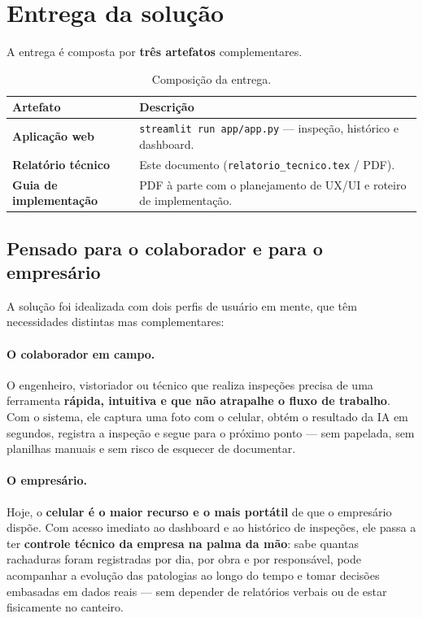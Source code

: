 \documentclass[11pt,a4paper]{article}
\begin{document}
\section{Entrega da solução}
A entrega é composta por \textbf{três artefatos} complementares.

\begin{table}[H]\centering\small
\renewcommand{\arraystretch}{1.3}
\begin{tabular}{>{\bfseries}l >{\raggedright\arraybackslash}p{9.5cm}}
\toprule
Artefato & Descrição \\
\midrule
Aplicação web & \texttt{streamlit run app/app.py} — inspeção, histórico e dashboard. \\
Relatório técnico & Este documento (\texttt{relatorio\_tecnico.tex} / PDF). \\
Guia de implementação & PDF à parte com o planejamento de UX/UI e roteiro de implementação. \\
\bottomrule
\end{tabular}
\caption{Composição da entrega.}
\end{table}

\subsection{Pensado para o colaborador e para o empresário}

A solução foi idealizada com dois perfis de usuário em mente, que têm necessidades distintas
mas complementares:

\paragraph{O colaborador em campo.}
O engenheiro, vistoriador ou técnico que realiza inspeções precisa de uma ferramenta
\textbf{rápida, intuitiva e que não atrapalhe o fluxo de trabalho}. Com o sistema, ele captura
uma foto com o celular, obtém o resultado da IA em segundos, registra a inspeção e segue para
o próximo ponto — sem papelada, sem planilhas manuais e sem risco de esquecer de documentar.

\paragraph{O empresário.}
Hoje, o \textbf{celular é o maior recurso e o mais portátil} de que o empresário dispõe.
Com acesso imediato ao dashboard e ao histórico de inspeções, ele passa a ter
\textbf{controle técnico da empresa na palma da mão}: sabe quantas rachaduras foram registradas
por dia, por obra e por responsável, pode acompanhar a evolução das patologias ao longo do
tempo e tomar decisões embasadas em dados reais — sem depender de relatórios verbais ou de
estar fisicamente no canteiro.
\end{document}
